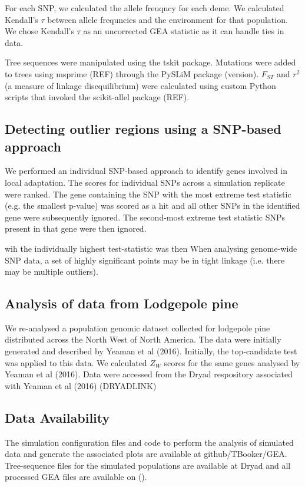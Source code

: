 \documentclass[11pt,twoside,lineno]{GSA_format}
\begin{document}
For each SNP, we calculated the allele freuqncy for each deme. We calculated Kendall's $\tau$ between allele frequncies and the environment for that population.  We chose Kendall's $\tau$ as an uncorrected GEA statistic as it can handle ties in data. 

Tree sequences were manipulated using the tskit package. Mutations were added to trees using msprime (REF) through the PySLiM package (version). $F_{ST}$ and $r^2$ (a measure of linkage disequilibrium) were calculated using custom Python scripts that invoked the scikit-allel package (REF).

\subsection{Detecting outlier regions using a SNP-based approach}

We performed an individual SNP-based approach to identify genes involved in local adaptation. The scores for individual SNPs across a simulation replicate were ranked. The gene containing the SNP with the most extreme test statistic (e.g. the smallest p-value) was scored as a hit and all other SNPs in the identified gene were subsequently ignored. The second-most extreme test statistic SNPs present in that gene were then ignored. 

wih the individually highest test-statistic was then
When analysing genome-wide SNP data, a set of highly significant points may be in tight linkage (i.e. there may be multiple outliers). 


\subsection{Analysis of data from Lodgepole pine}

We re-analysed a population genomic dataset collected for lodgepole pine distributed across the North West of North America. The data were initially generated and described by Yeaman et al (2016). Initially, the top-candidate test was applied to this data. We calculated $Z_W$ scores for the same genes analysed by Yeaman et al (2016). Data were accessed from the Dryad respository associated with Yeaman et al (2016) (DRYADLINK)

\subsection{Data Availability}

The simulation configuration files and code to perform the analysis of simulated data and generate the associated plots are available at github/TBooker/GEA. Tree-sequence files for the simulated populations are available at Dryad and all processed GEA files are available on (). 
\end{document}
